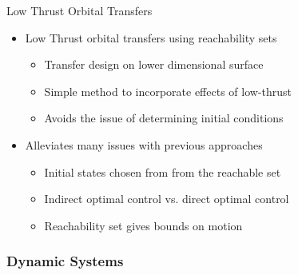 \begin{frame}{Low Thrust Orbital Transfers} %
    \begin{itemize}
        \item Low Thrust orbital transfers using reachability sets 
        \begin{itemize}
            \item Transfer design on lower dimensional \Poincare surface
            \item Simple method to incorporate effects of low-thrust 
            \item Avoids the issue of determining initial conditions
        \end{itemize}
    \pause
        \item Alleviates many issues with previous approaches
        \begin{itemize}
            \item Initial states chosen from from the reachable set
            \item Indirect optimal control vs. direct optimal control
            \item Reachability set gives bounds on motion
        \end{itemize}    
    \end{itemize}

\end{frame} %

\subsubsection[Dynamic Systems Theory Review]{Dynamic Systems}

